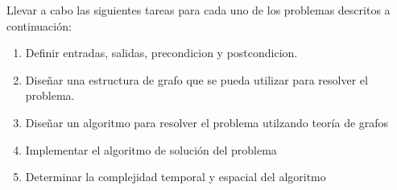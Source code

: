 Llevar a cabo las siguientes tareas para cada uno de los problemas descritos a continuación:
%
\begin{enumerate}
	\item Definir entradas, salidas, precondicion y postcondicion.
	\item Diseñar una estructura de grafo que se pueda utilizar para resolver el problema.
	\item Diseñar un algoritmo para resolver el problema utilzando teoría de grafos
	\item Implementar el algoritmo de solución del problema
	\item Determinar la complejidad temporal y espacial del algoritmo
\end{enumerate}
